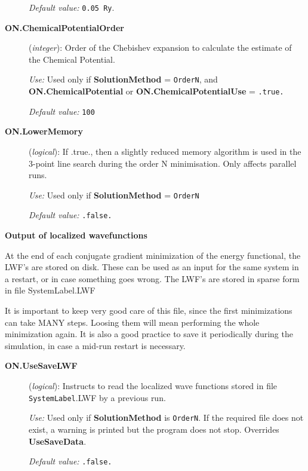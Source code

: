 \documentclass[11pt]{article}
\begin{document}
\begin{description}
{\it Default value:} {\tt 0.05 Ry}.

\item[{\bf ON.ChemicalPotentialOrder}] ({\it integer}):
Order of the Chebishev expansion to calculate the estimate
of the Chemical Potential.

{\it Use:} Used only if {\bf SolutionMethod} = {\tt OrderN},
and {\bf ON.ChemicalPotential} or  {\bf ON.ChemicalPotentialUse} =
{\tt .true.}

{\it Default value:} {\tt 100}

\item[{\bf ON.LowerMemory}] ({\it logical}):
If .true., then a slightly reduced memory algorithm is used in the
3-point line search during the order N minimisation. Only affects
parallel runs.

{\it Use:} Used only if  {\bf SolutionMethod} = {\tt OrderN}

{\it Default value:} {\tt .false.}


\end{description}

{\bf Output of localized wavefunctions}

At the end of each conjugate gradient minimization of the energy
functional, the LWF's are stored on disk. These can be used as an
input for the same system in a restart, or in case something goes
wrong.  The LWF's are stored in sparse form in file SystemLabel.LWF

It is important to keep very good care of this file, since the first
minimizations can take MANY steps. Loosing them will mean performing
the whole minimization again. It is also a good practice to save it
periodically during the simulation, in case a mid-run restart is
necessary.

\begin{description}

\item[{\bf ON.UseSaveLWF}] ({\it logical}):
Instructs to read the localized wave functions stored in file
{\tt SystemLabel}.LWF by a previous run.

{\it Use:} Used only if {\bf SolutionMethod} is {\tt OrderN}.
If the required file does not exist, a warning is
printed but the program does not stop. Overrides {\bf UseSaveData}.

{\it Default value:} {\tt .false.}

\end{description}
\end{document}
